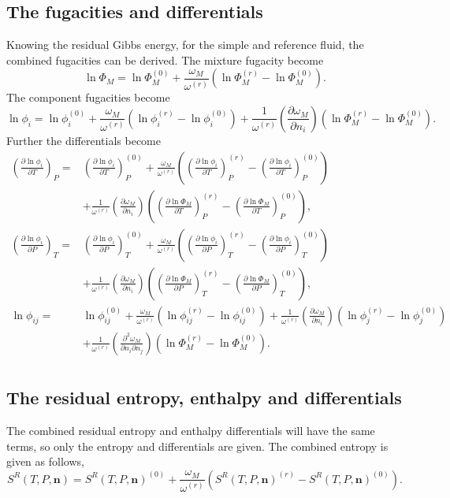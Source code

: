 \documentclass[english]{../thermomemo/thermomemo}
\numberwithin{equation}{section}
\newcommand*{\pder}[2]{\left(\frac{\partial #1}{\partial #2}\right)}
\newcommand*{\pdcross}[3]{\left(\frac{\partial^2 #1}{\partial #2 \partial #3}\right)}
\begin{document}
\subsection{The fugacities and differentials}
Knowing the residual Gibbs energy, for the simple and reference fluid,
the combined fugacities can be derived. The mixture fugacity become
\begin{equation}
\label{eq:LK_fugacity}
\ln \Phi_M = \ln \Phi_M^{(0)} + \frac{\omega_M}{\omega^{(r)}}\left(\ln \Phi_M^{(r)} - \ln \Phi_M^{(0)}\right).
\end{equation}
The component fugacities become
\begin{equation}
\label{eq:LK_comp_fugacity}
\ln \phi_i = \ln \phi_i^{(0)} + \frac{\omega_M}{\omega^{(r)}}\left(\ln
\phi_i^{(r)} - \ln \phi_i^{(0)}\right) + \frac{1}{\omega^{(r)}}\pder{\omega_M}{n_i}\left(\ln \Phi_M^{(r)} - \ln \Phi_M^{(0)}\right).
\end{equation}
Further the differentials become
\begin{align}
\label{eq:LK_comp_fugacity_diff}
\pder{\ln \phi_i}{T}_{P} =& \pder{\ln \phi_i}{T}_{P}^{(0)} +
\frac{\omega_M}{\omega^{(r)}}\left(\pder{\ln \phi_i}{T}_{P}^{(r)} -
\pder{\ln \phi_i}{T}_{P}^{(0)}\right) \\
&+ \frac{1}{\omega^{(r)}}\pder{\omega_M}{n_i}\left(\pder{\ln
  \Phi_M}{T}_{P}^{(r)} - \pder{\ln \Phi_M}{T}_{P}^{(0)}\right), \\
\pder{\ln \phi_i}{P}_{T} =& \pder{\ln \phi_i}{P}_{T}^{(0)} +
\frac{\omega_M}{\omega^{(r)}}\left(\pder{\ln \phi_i}{P}_{T}^{(r)} -
\pder{\ln \phi_i}{P}_{T}^{(0)}\right) \\ 
&+ \frac{1}{\omega^{(r)}}\pder{\omega_M}{n_i}\left(\pder{\ln
  \Phi_M}{P}_{T}^{(r)} - \pder{\ln \Phi_M}{P}_{T}^{(0)}\right), \\
\ln \phi_{ij} =& \ln \phi_{ij}^{(0)} +
\frac{\omega_M}{\omega^{(r)}}\left(\ln \phi_{ij}^{(r)} - \ln
\phi_{ij}^{(0)}\right) + \frac{1}{\omega^{(r)}}\pder{\omega_M}{n_i}\left(\ln
\phi_j^{(r)} - \ln \phi_j^{(0)}\right)\\ 
& + \frac{1}{\omega^{(r)}}\pdcross{\omega_M}{n_i}{n_j}\left(\ln \Phi_M^{(r)} - \ln
\Phi_M^{(0)}\right). \\
\end{align}

\subsection{The residual entropy, enthalpy and differentials}
The combined residual entropy and enthalpy differentials will have the
same terms, so only the entropy and differentials are given. The
combined entropy is given as follows,
\begin{equation}
\label{eq:LK_entropy}
S^R(T,P,\textbf{n}) = S^R(T,P,\textbf{n})^{(0)} + \frac{\omega_M}{\omega^{(r)}}\left(S^R(T,P,\textbf{n})^{(r)} - S^R(T,P,\textbf{n})^{(0)}\right).
\end{equation}
\end{document}
